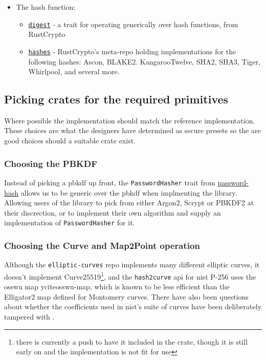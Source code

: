 \begin{itemize}
  \item{
    The hash function:
    \begin{itemize}
      \item{\href{https://github.com/RustCrypto/traits/tree/master/digest}{\texttt{digest}} - a trait for operating generically over hash functions, from RustCrypto}
      \item{\href{https://github.com/RustCrypto/hashes}{\texttt{hashes}} - RustCrypto's meta-repo holding implementations for the following hashes: Ascon, BLAKE2. KangarooTwelve, SHA2, SHA3, Tiger, Whirlpool, and several more.}
    \end{itemize}
  }
\end{itemize}

\subsection{Picking crates for the required primitives}
Where possible the implementation should match the reference implementation.
These choices are what the designers have determined as secure presets so the are good choices should a suitable crate exist.

\subsubsection{Choosing the PBKDF}
Instead of picking a \gls{pbkdf} up front, the \texttt{PasswordHasher} trait from \href{https://github.com/RustCrypto/traits/tree/master/password-hash}{password-hash} allows us to be generic over the \gls{pbkdf} when implmenting the library.
Allowing users of the library to pick from either Argon2, Scrypt or PBKDF2 at their discrection, or to implement their own algorithm and supply an implementation of \texttt{PasswordHasher} for it.

\subsubsection{Choosing the Curve and \textsf{Map2Point} operation}
Although the \texttt{elliptic-curves} repo implements many different elliptic curves, it doesn't implement Curve25519\footnote{there is currently a push to have it included in the crate, though it is still early on and the implementation is not fit for use}, and the \texttt{hash2curve} \gls{api} for \gls{nist} P-256 uses the \gls{osswu} map ycite{osswu-map}, which is known to be less efficient than the Elligator2 map defined for Montomery curves.
There have also been questions about whether the coefficients used in \gls{nist}'s suite of curves have been deliberately tampered with \cite{curve-rigidity}.

